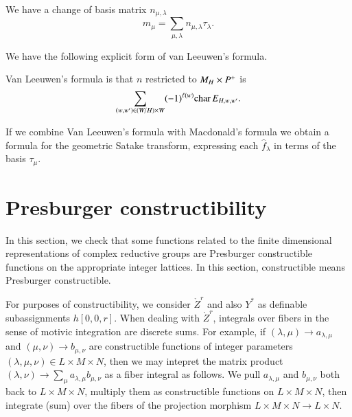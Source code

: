 We have a change of basis matrix $n_{\mu,\lambda}$ 
\begin{equation}\label{eqn:n}
m_\mu = \sum_{\mu,\lambda} n_{\mu,\lambda} \tau_\lambda.
\end{equation}

We have the following explicit form of van Leeuwen's formula.

\begin{lemma}
Van Leeuwen's formula is that $n$ restricted
to $M_H\times P^+$ is 
\[
\sum_{(w,w')\in (W/H)\times W} (-1)^{\ell(w)} {\operatorname{char}}\, E_{H,w,w'}.
\]
\end{lemma}

If we combine Van Leeuwen's formula with Macdonald's formula we obtain a formula
for the geometric Satake transform, expressing each $\hat f_\lambda$ in terms of the basis $\tau_\mu$.



\section{Presburger constructibility}

In this section,
we check that some functions related to the finite dimensional representations of complex reductive groups
are Presburger constructible functions on the appropriate integer lattices.  In this section, constructible means Presburger
constructible.

\begin{remark}\label{rem:matrix}
For purposes of constructibility, we consider $\ring{Z}^r$ and also $Y^*$ as 
definable subassignments $h[0,0,r]$. When dealing with $\ring{Z}^r$, integrals over fibers
in the sense of motivic integration are discrete sums.  For example, if $(\lambda,\mu)\to a_{\lambda,\mu}$
and $(\mu,\nu)\to b_{\mu,\nu}$ are constructible functions of integer parameters $(\lambda,\mu,\nu)\in L\times M\times N$,
then we may intepret the matrix product $(\lambda,\nu)\to \sum_{\mu} a_{\lambda,\mu} b_{\mu,\nu}$ as a
fiber integral as follows.  We pull $a_{\lambda,\mu}$ and $b_{\mu,\nu}$ both back to $L\times M\times N$, multiply
them as constructible functions on $L\times M\times N$, then integrate (sum) over the fibers of the projection morphism
$L\times M\times N\to L\times N$.
\end{remark}




